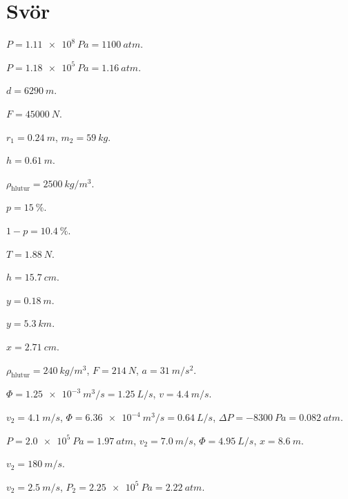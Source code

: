 \newpage

\section*{Svör}

\begin{enumerate*}[label = \vspace{0.15cm} \textbf{(\arabic*)}]
  \item $P = \SI{1.11e8}{Pa} = \SI{1100}{atm}$. \item $P = \SI{1.18e5}{Pa} = \SI{1.16}{atm}$.
  \item $d = \SI{6290}{m}$.
  \item $F = \SI{45000}{N}$.
  \item $r_1 = \SI{0.24}{m}$, $m_2 = \SI{59}{kg}$.
  \item $h = \SI{0.61}{m}$.
  \item $\rho_{\text{hlutur}} = \SI{2500}{kg/m^3}$.
  \item $p = \SI{15}{\%}$.
  \item $1-p = \SI{10.4}{\%}$.
  \item $T = \SI{1.88}{N}$.
  \item $h = \SI{15.7}{cm}$.
  \item $y = \SI{0.18}{m}$.
  \item $y = \SI{5.3}{km}$.
  \item $x = \SI{2.71}{cm}$.
  \item $\rho_{\text{hlutur}} = \SI{240}{kg/m^3}$, $F = \SI{214}{N}$, $a = \SI{31}{m/s^2}$.
  \item $\Phi = \SI{1.25e-3}{m^3/s} = \SI{1.25}{L/s}$, $v = \SI{4.4}{m/s}$.
  \item $v_2 = \SI{4.1}{m/s}$, $\Phi = \SI{6.36e-4}{m^3/s} = \SI{0.64}{L/s}$, $\Delta P = \SI{-8300}{Pa} = \SI{0.082}{atm}$.
  \item $P = \SI{2.0e5}{Pa} = \SI{1.97}{atm}$, $v_2 = \SI{7.0}{m/s}$, $\Phi = \SI{4.95}{L/s}$, $x = \SI{8.6}{m}$.
  \item $v_2 = \SI{180}{m/s}$.
  \item $v_2 = \SI{2.5}{m/s}$, $P_2 = \SI{2.25e5}{Pa} = \SI{2.22}{atm}$.
\end{enumerate*}

\newpage